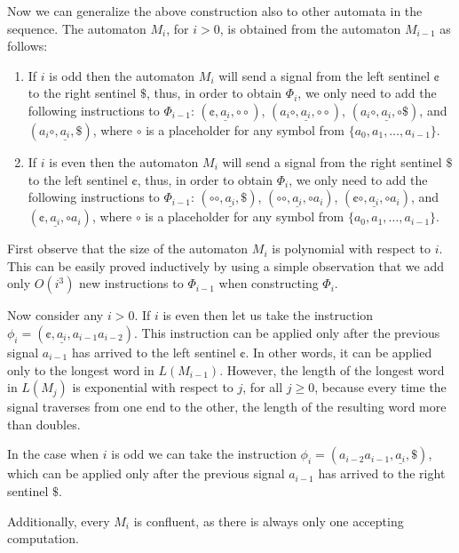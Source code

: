 \begin{example}
Now we can generalize the above construction also to other automata in the sequence. The automaton $M_i$, for $i > 0$, is obtained from the automaton $M_{i-1}$ as follows:
\begin{enumerate}
\item If $i$ is odd then the automaton $M_i$ will send a signal from the left sentinel $\cent$ to the right sentinel $\$$, thus, in order to obtain $\Phi_i$, we only need to add  the following instructions to $\Phi_{i-1}$: $(\cent, \underline{a_i}, \circ \circ)$, $(a_i \circ, \underline{a_i}, \circ \circ)$, $(a_i \circ, \underline{a_i}, \circ \$)$, and $(a_i \circ, \underline{a_i}, \$)$, where $\circ$ is a placeholder for any symbol from $\{ a_0, a_1, \ldots, a_{i-1} \}$.

\item If $i$ is even then the automaton $M_i$ will send a signal from the right sentinel $\$$ to the left sentinel $\cent$, thus, in order to obtain $\Phi_i$, we only need to add  the following instructions to $\Phi_{i-1}$: $(\circ \circ, \underline{a_i}, \$)$, $(\circ \circ, \underline{a_i}, \circ a_i)$, $(\cent \circ, \underline{a_i}, \circ a_i)$, and $(\cent, \underline{a_i}, \circ a_i)$, where $\circ$ is a placeholder for any symbol from $\{ a_0, a_1, \ldots, a_{i-1} \}$.
\end{enumerate}

First observe that the size of the automaton $M_i$ is polynomial with respect to $i$. This can be easily proved inductively by using a simple observation that we add only $O(i^3)$ new instructions to $\Phi_{i-1}$ when constructing $\Phi_i$.

Now consider any $i > 0$. If $i$ is even then let us take the instruction $\phi_i = (\cent, \underline{a_i}, a_{i-1} a_{i-2})$. This instruction can be applied only after the previous signal $a_{i-1}$ has arrived to the left sentinel $\cent$. In other words, it can be applied only to the longest word in $L(M_{i-1})$. However, the length of the longest word in $L(M_j)$ is exponential with respect to $j$, for all $j \ge 0$, because every time the signal traverses from one end to the other, the length of the resulting word more than doubles.

In the case when $i$ is odd we can take the instruction $\phi_i = (a_{i-2} a_{i-1}, \underline{a_i}, \$)$, which can be applied only after the previous signal $a_{i-1}$ has arrived to the right sentinel $\$$.

Additionally, every $M_i$ is confluent, as there is always only one accepting computation.
\end{example}

